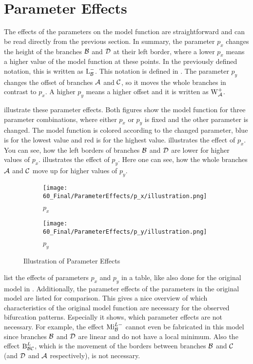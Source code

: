 \section{Parameter Effects}

The effects of the parameters on the model function are straightforward and can be read directly from the previous section.
In summary, the parameter $p_x$ changes the height of the branches $\mathcal{B}$ and $\mathcal{D}$ at their left border, where a lower $p_x$ means a higher value of the model function at these points.
In the previously defined notation, this is written as $\operatorname{L}_{\mathcal{B}}^-$.
This notation is defined in .
The parameter $p_y$ changes the offset of branches $\mathcal{A}$ and $\mathcal{C}$, so it moves the whole branches in contrast to $p_x$.
A higher $p_y$ means a higher offset and it is written as $\operatorname{W}_{\mathcal{A}}^+$.


 illustrate these parameter effects.
Both figures show the model function for three parameter combinations, where either $p_x$ or $p_y$ is fixed and the other parameter is changed.
The model function is colored according to the changed parameter, blue is for the lowest value and red is for the highest value.
 illustrates the effect of $p_x$.
You can see, how the left borders of branches $\mathcal{B}$ and $\mathcal{D}$ are lower for higher values of $p_x$.
 illustrates the effect of $p_y$.
Here one can see, how the whole branches $\mathcal{A}$ and $\mathcal{C}$ move up for higher values of $p_y$.

\begin{figure}
    \centering
    \begin{subfigure}{0.4\textwidth}
        \centering
        \texttt{[image: 60\_Final/ParameterEffects/p\_x/illustration.png]}
        \caption{$p_x$}
        \label{fig:final.param.effects.px}
    \end{subfigure}
    \begin{subfigure}{0.4\textwidth}
        \centering
        \texttt{[image: 60\_Final/ParameterEffects/p\_y/illustration.png]}
        \caption{$p_y$}
        \label{fig:final.param.effects.py}
    \end{subfigure}
    \caption{Illustration of Parameter Effects}
\end{figure}

 list the effects of parameters $p_x$ and $p_y$ in a table, like also done for the original model in .
Additionally, the parameter effects of the parameters in the original model are listed for comparison.
This gives a nice overview of which characteristics of the original model function are necessary for the observed bifurcation patterns.
Especially it shows, which parameter effects are not necessary.
For example, the effect $\operatorname{Mi}_{\mathcal{B}}^{L-}$ cannot even be fabricated in this model since branches $\mathcal{B}$ and $\mathcal{D}$ are linear and do not have a local minimum.
Also the effect $\operatorname{B}_{\mathcal{B}\mathcal{C}}^L$, which is the movement of the borders between branches $\mathcal{B}$ and $\mathcal{C}$ (and $\mathcal{D}$ and $\mathcal{A}$ respectively), is not necessary.

